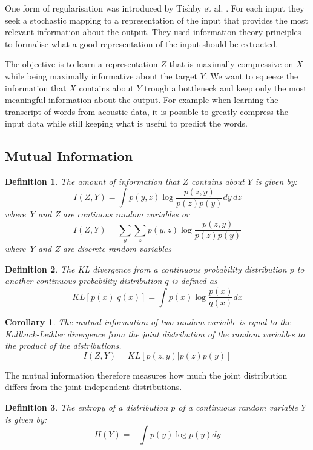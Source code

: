 \documentclass[10pt,oneside,openright]{report}
\newtheorem{definition}{Definition}
\newtheorem{corollary}{Corollary}
\begin{document}
One form of regularisation was introduced by Tishby et al. \cite{tishby}. For each input they seek a stochastic mapping to a representation of the input that provides the most relevant information about the output. They used information theory principles to formalise what a good representation of the input should be extracted. 

The objective is to learn a representation $Z$ that is maximally compressive on $X$ while being maximally informative about the target $Y$. We want to squeeze the information that $X$ contains about $Y$ trough a bottleneck and keep only the most meaningful information about the output. For example when learning the transcript of words from acoustic data, it is possible to greatly compress the input data while still keeping what is useful to predict the words.

\subsection{Mutual Information}

\begin{definition}
The amount of information that $Z$ contains about $Y$ is given by:
$$ I(Z, Y) = \int p(y, z) \log \frac{p(z, y)}{p(z)p(y)} dy\,dz $$ where Y and Z are continous random variables or 
 $$ I(Z, Y) = \sum_y \sum_z p(y, z) \log \frac{p(z, y)}{p(z)p(y)} $$ where Y and Z are discrete random variables 
\end{definition}

\begin{definition}
The KL divergence from a continuous probability distribution $p$ to another continuous probability distribution $q$ is defined as 
$$ KL[p(x)|q(x)] = \int p(x) \log \frac{p(x)}{q(x)} dx $$
\end{definition}

\begin{corollary}
The mutual information of two random variable is equal to the Kullback-Leibler divergence from the joint distribution of the random variables to the product of the distributions.
$$ I(Z, Y) = KL[p(z, y) | p(z)p(y)] $$
\end{corollary}
The mutual information therefore measures how much the joint distribution differs from the joint independent distributions. 

\begin{definition}
The entropy of a distribution $p$ of a continuous random variable $Y$ is given by:
$$ H(Y)  = -\int p(y) \log p(y) dy $$
\end{definition}
\end{document}
